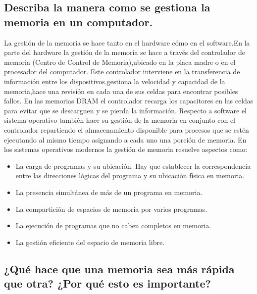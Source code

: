 \documentclass{article}
\begin{document}
\subsection{Describa la manera como se gestiona la memoria en un computador.}
La gestión  de la memoria se hace tanto en el hardware cómo en el software.En la parte del hardware la gestión de la memoria se hace a través del controlador de memoria (Centro de Control de Memoria),ubicado en la placa madre o en el procesador del computador.
Este controlador interviene en la transferencia de información entre los dispositivos,gestiona la velocidad y capacidad de la memoria,hace una revisión en cada una de  sus celdas para encontrar posibles fallos.
En las memorias DRAM el controlador recarga los capacitores en las celdas para evitar que se descarguen y se pierda la información\cite{ref2}.
Respecto a software el sistema operativo también  hace su gestión de la memoria en conjunto con el controlador repartiendo el almacenamiento disponible para procesos que se estén ejecutando al mismo tiempo asignando a cada uno una porción de memoria\cite{gm}.\newline
 En los sistemas operativos modernos la
gestión de memoria resuelve aspectos como:
\begin{itemize}
    \item {La carga de programas y su ubicación. Hay que establecer la correspondencia
entre las direcciones lógicas del programa y su ubicación física en memoria.}
\item{ La presencia simultánea de más de un programa en memoria.}

\item{ La compartición de espacios de memoria por varios programas.}

\item{ La ejecución de programas que no caben completos en memoria.}
\item{ La gestión eficiente del espacio de memoria libre}\cite{gestion}.
\end{itemize}







\subsection{¿Qué hace que una memoria sea más rápida que otra? ¿Por qué esto es importante?}
\end{document}
